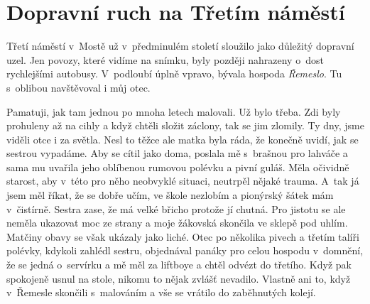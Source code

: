 
\chapter{Dopravní ruch na Třetím náměstí}

Třetí náměstí v~Mostě už v~předminulém století sloužilo jako důležitý dopravní
uzel. Jen povozy, které vidíme na snímku, byly později nahrazeny o~dost
rychlejšími autobusy. V~podloubí úplně vpravo, bývala hospoda {\em Řemeslo}. Tu
s~oblibou navštěvoval i můj otec.

Pamatuji, jak tam jednou po mnoha letech malovali. Už bylo třeba. Zdi byly
prohuleny až na cihly a když chtěli složit záclony, tak se jim zlomily. Ty dny,
jsme viděli otce i za světla. Nesl to těžce ale matka byla ráda, že konečně
uvidí, jak se sestrou vypadáme. Aby se cítil jako doma, poslala mě s~brašnou
pro lahváče a sama mu uvařila jeho oblíbenou rumovou polévku a pivní guláš.
Měla očividně starost, aby v~této pro něho neobvyklé situaci, neutrpěl nějaké
trauma. A~tak já jsem měl říkat, že se dobře učím, ve škole nezlobím a
pionýrský šátek mám v~čistírně. Sestra zase, že má velké břicho protože jí
chutná. Pro jistotu se ale neměla ukazovat moc ze strany a moje žákovská
skončila ve sklepě pod uhlím. Matčiny obavy se však ukázaly jako liché. Otec po
několika pivech a třetím talíři polévky, kdykoli zahlédl sestru, objednával
panáky pro celou hospodu v~domnění, že se jedná o~servírku a mě měl za liftboye
a chtěl odvézt do třetího. Když pak spokojeně usnul na stole, nikomu to nějak
zvlášť nevadilo. Vlastně ani to, když v~Řemesle skončili s~malováním a vše se
vrátilo do zaběhnutých kolejí.


